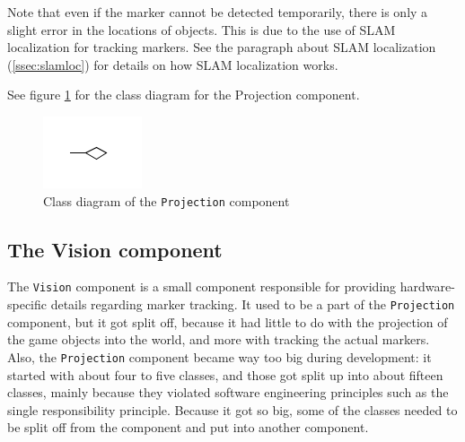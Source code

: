 			Note that even if the marker cannot be detected temporarily, there 
			is only a slight error in the locations of objects. This is due to 
			the use of SLAM localization for tracking markers. See the paragraph
			about SLAM localization (\ref{ssec:slamloc}) for details on how SLAM 
			localization works.
			
			See figure \ref{fig:classdiagramprojection} for the class diagram for 
			the Projection component.
			
			\begin{figure}[ht]
				\includegraphics[width=\textwidth]{ClassDiagramProjection}
				\caption{Class diagram of the \texttt{Projection} component}
				\label{fig:classdiagramprojection}
			\end{figure}
			
		\subsection{The Vision component} \label{ssec:visioncomponent}
			The \texttt{Vision} component is a small component responsible for
            providing hardware-specific details regarding marker tracking. 
            It used to be a part of the \texttt{Projection} component, but 
            it got split off, because it had little to do with the projection 
            of the game objects into the world, and more with tracking the 
            actual markers. Also, the \texttt{Projection} component became way 
            too big during development: it started with about four to five 
            classes, and those got split up into about fifteen classes, mainly 
            because they violated software engineering principles such as the 
            single responsibility principle. Because it got so big, some of the 
            classes needed to be split off from the component and put into 
            another component.
			
